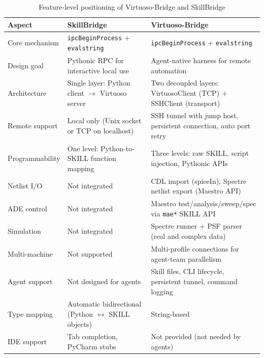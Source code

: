 \begin{table}[!t]
\caption{Feature-level positioning of Virtuoso-Bridge and SkillBridge}
\label{tab:comparison_ieee}
\centering
\small
\begin{tabular}{p{}p{}p{}}
\toprule
Aspect & SkillBridge & Virtuoso-Bridge \\
\midrule
Core mechanism & \texttt{ipcBeginProcess} + \texttt{evalstring} & \texttt{ipcBeginProcess} + \texttt{evalstring} \\
Design goal & Pythonic RPC for interactive local use & Agent-native harness for remote automation \\
Architecture & Single layer: Python client $\to$ Virtuoso server & Two decoupled layers: VirtuosoClient (TCP) + SSHClient (transport) \\
Remote support & Local only (Unix socket or TCP on localhost) & SSH tunnel with jump host, persistent connection, auto port retry \\
Programmability & One level: Python-to-SKILL function mapping & Three levels: raw SKILL, script injection, Pythonic APIs \\
Netlist I/O & Not integrated & CDL import (spiceIn), Spectre netlist export (Maestro API) \\
ADE control & Not integrated & Maestro test/analysis/sweep/spec via \texttt{mae*} SKILL API \\
Simulation & Not integrated & Spectre runner + PSF parser (real and complex data) \\
Multi-machine & Not supported & Multi-profile connections for agent-team parallelism \\
Agent support & Not designed for agents & Skill files, CLI lifecycle, persistent tunnel, command logging \\
Type mapping & Automatic bidirectional (Python $\leftrightarrow$ SKILL objects) & String-based \\
IDE support & Tab completion, PyCharm stubs & Not provided (not needed by agents) \\
\bottomrule
\end{tabular}
\end{table}
